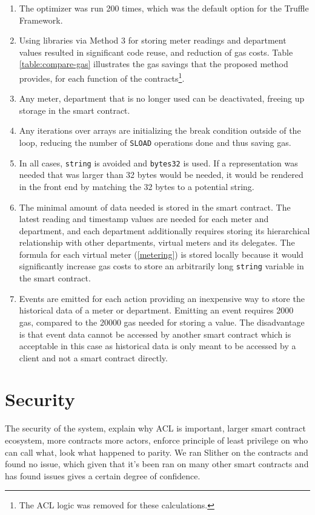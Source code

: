 \begin{enumerate}
    \item The optimizer was run 200 times, which was the default option for the Truffle Framework.
    \item Using libraries via Method 3 for storing meter readings and department values resulted in significant code reuse, and reduction of gas costs. Table \ref{table:compare-gas} illustrates the gas savings that the proposed method provides, for each function of the contracts\footnote{The ACL logic was removed for these calculations.}.
    \item Any meter, department that is no longer used can be deactivated, freeing up storage in the smart contract.
    \item Any iterations over arrays are initializing the break condition outside of the loop, reducing the number of \texttt{SLOAD} operations done and thus saving gas.
    \item In all cases, \texttt{string} is avoided and \texttt{bytes32} is used. If a representation was needed that was larger than 32 bytes would be needed, it would be rendered in the front end by matching the 32 bytes to a potential string. 
    \item The minimal amount of data needed is stored in the smart contract. The latest reading and timestamp values are needed for each meter and department, and each department additionally requires storing its hierarchical relationship with other departments, virtual meters and its delegates. The formula for each virtual meter (\ref{metering}) is stored locally because it would significantly increase gas costs to store an arbitrarily long \texttt{string} variable in the smart contract.
    \item Events are emitted for each action providing an inexpensive way to store the historical data of a meter or department. Emitting an event requires 2000 gas, compared to the 20000 gas needed for storing a value. The disadvantage is that event data cannot be accessed by another smart contract which is acceptable in this case as historical data is only meant to be accessed by a client and not a smart contract directly. 
\end{enumerate}



\section{Security}
The security of the system, explain why ACL is important, larger smart contract ecosystem, more contracts more actors, enforce principle of least privilege on who can call what, look what happened to parity. We ran Slither on the contracts and found no issue, which given that it's been ran on many other smart contracts and has found issues gives a certain degree of confidence. 

